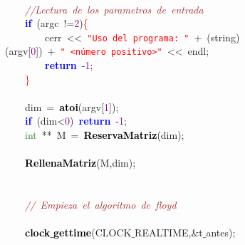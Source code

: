 \mbox{}\ \ \ \  \\
\mbox{}\ \ \ \ \textit{\textcolor{Brown}{//Lectura\ de\ los\ parametros\ de\ entrada}} \\
\mbox{}\ \ \ \ \textbf{\textcolor{Blue}{if}}\ \textcolor{BrickRed}{(}argc\ \textcolor{BrickRed}{!=}\textcolor{Purple}{2}\textcolor{BrickRed}{)}\textcolor{Red}{\{} \\
\mbox{}\ \ \ \ \ \ \ \ cerr\ \textcolor{BrickRed}{\textless{}\textless{}}\ \texttt{\textcolor{Red}{"{}Uso\ del\ programa:\ "{}}}\ \textcolor{BrickRed}{+}\ \textcolor{BrickRed}{(}string\textcolor{BrickRed}{)(}argv\textcolor{BrickRed}{[}\textcolor{Purple}{0}\textcolor{BrickRed}{])}\ \textcolor{BrickRed}{+}\ \texttt{\textcolor{Red}{"{}\ \textless{}número\ positivo\textgreater{}"{}}}\ \textcolor{BrickRed}{\textless{}\textless{}}\ endl\textcolor{BrickRed}{;}\ \  \\
\mbox{}\ \ \ \ \ \ \ \ \textbf{\textcolor{Blue}{return}}\ \textcolor{BrickRed}{-}\textcolor{Purple}{1}\textcolor{BrickRed}{;} \\
\mbox{}\ \ \ \ \textcolor{Red}{\}} \\
\mbox{}\ \ \ \  \\
\mbox{}\ \ \ \ dim\ \textcolor{BrickRed}{=}\ \textbf{\textcolor{Black}{atoi}}\textcolor{BrickRed}{(}argv\textcolor{BrickRed}{[}\textcolor{Purple}{1}\textcolor{BrickRed}{]);} \\
\mbox{}\ \ \ \ \textbf{\textcolor{Blue}{if}}\ \textcolor{BrickRed}{(}dim\textcolor{BrickRed}{\textless{}}\textcolor{Purple}{0}\textcolor{BrickRed}{)}\ \textbf{\textcolor{Blue}{return}}\ \textcolor{BrickRed}{-}\textcolor{Purple}{1}\textcolor{BrickRed}{;} \\
\mbox{}\ \ \ \ \textcolor{ForestGreen}{int}\ \textcolor{BrickRed}{**}\ M\ \textcolor{BrickRed}{=}\ \textbf{\textcolor{Black}{ReservaMatriz}}\textcolor{BrickRed}{(}dim\textcolor{BrickRed}{);} \\
\mbox{}\ \ \ \  \\
\mbox{}\ \ \ \ \textbf{\textcolor{Black}{RellenaMatriz}}\textcolor{BrickRed}{(}M\textcolor{BrickRed}{,}dim\textcolor{BrickRed}{);} \\
\mbox{}\ \ \ \  \\
\mbox{}\ \ \ \  \\
\mbox{}\ \ \ \ \textit{\textcolor{Brown}{//\ Empieza\ el\ algoritmo\ de\ floyd}} \\
\mbox{}\ \ \ \  \\
\mbox{}\ \ \ \ \textbf{\textcolor{Black}{clock$\_$gettime}}\textcolor{BrickRed}{(}CLOCK$\_$REALTIME\textcolor{BrickRed}{,\&}t$\_$antes\textcolor{BrickRed}{);} \\

